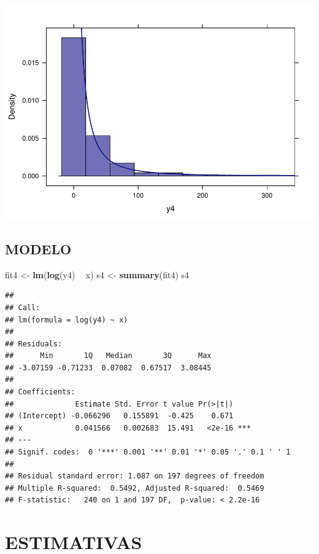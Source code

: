 \documentclass[]{article}
\newenvironment{Shaded}{\begin{snugshade}}{\end{snugshade}}
\newcommand{\KeywordTok}[1]{\textcolor[rgb]{0.13,0.29,0.53}{\textbf{#1}}}
\newcommand{\StringTok}[1]{\textcolor[rgb]{0.31,0.60,0.02}{#1}}
\newcommand{\OperatorTok}[1]{\textcolor[rgb]{0.81,0.36,0.00}{\textbf{#1}}}
\newcommand{\NormalTok}[1]{#1}
\begin{document}
\includegraphics{Impacto_sigma_files/figure-latex/unnamed-chunk-20-1.pdf}

\subsection{MODELO}\label{modelo-4}

\begin{Shaded}
\begin{Highlighting}[]
\NormalTok{fit4 <-}\StringTok{ }\KeywordTok{lm}\NormalTok{(}\KeywordTok{log}\NormalTok{(y4) }\OperatorTok{~}\StringTok{ }\NormalTok{x)}
\NormalTok{s4 <-}\StringTok{ }\KeywordTok{summary}\NormalTok{(fit4)}
\NormalTok{s4}
\end{Highlighting}
\end{Shaded}

\begin{verbatim}
## 
## Call:
## lm(formula = log(y4) ~ x)
## 
## Residuals:
##      Min       1Q   Median       3Q      Max 
## -3.07159 -0.71233  0.07082  0.67517  3.08445 
## 
## Coefficients:
##              Estimate Std. Error t value Pr(>|t|)    
## (Intercept) -0.066296   0.155891  -0.425    0.671    
## x            0.041566   0.002683  15.491   <2e-16 ***
## ---
## Signif. codes:  0 '***' 0.001 '**' 0.01 '*' 0.05 '.' 0.1 ' ' 1
## 
## Residual standard error: 1.087 on 197 degrees of freedom
## Multiple R-squared:  0.5492, Adjusted R-squared:  0.5469 
## F-statistic:   240 on 1 and 197 DF,  p-value: < 2.2e-16
\end{verbatim}

\section{ESTIMATIVAS}\label{estimativas}
\end{document}
